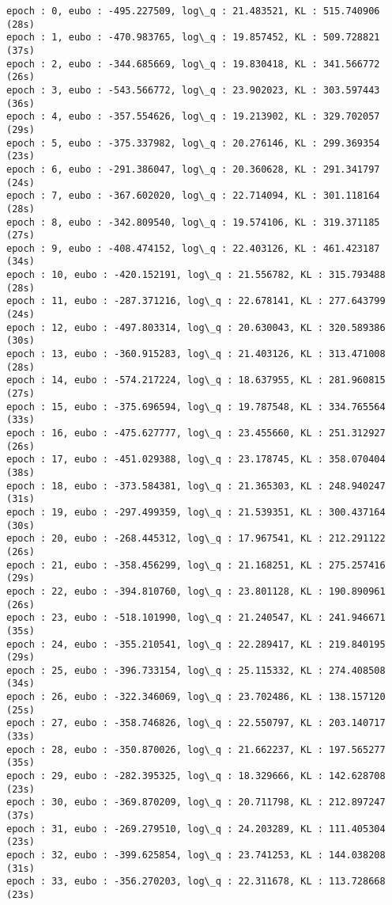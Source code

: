 \documentclass[11pt]{article}
\begin{document}
    \begin{Verbatim}[commandchars=\\\{\}]
epoch : 0, eubo : -495.227509, log\_q : 21.483521, KL : 515.740906 (28s)
epoch : 1, eubo : -470.983765, log\_q : 19.857452, KL : 509.728821 (37s)
epoch : 2, eubo : -344.685669, log\_q : 19.830418, KL : 341.566772 (26s)
epoch : 3, eubo : -543.566772, log\_q : 23.902023, KL : 303.597443 (36s)
epoch : 4, eubo : -357.554626, log\_q : 19.213902, KL : 329.702057 (29s)
epoch : 5, eubo : -375.337982, log\_q : 20.276146, KL : 299.369354 (23s)
epoch : 6, eubo : -291.386047, log\_q : 20.360628, KL : 291.341797 (24s)
epoch : 7, eubo : -367.602020, log\_q : 22.714094, KL : 301.118164 (28s)
epoch : 8, eubo : -342.809540, log\_q : 19.574106, KL : 319.371185 (27s)
epoch : 9, eubo : -408.474152, log\_q : 22.403126, KL : 461.423187 (34s)
epoch : 10, eubo : -420.152191, log\_q : 21.556782, KL : 315.793488 (28s)
epoch : 11, eubo : -287.371216, log\_q : 22.678141, KL : 277.643799 (24s)
epoch : 12, eubo : -497.803314, log\_q : 20.630043, KL : 320.589386 (30s)
epoch : 13, eubo : -360.915283, log\_q : 21.403126, KL : 313.471008 (28s)
epoch : 14, eubo : -574.217224, log\_q : 18.637955, KL : 281.960815 (27s)
epoch : 15, eubo : -375.696594, log\_q : 19.787548, KL : 334.765564 (33s)
epoch : 16, eubo : -475.627777, log\_q : 23.455660, KL : 251.312927 (26s)
epoch : 17, eubo : -451.029388, log\_q : 23.178745, KL : 358.070404 (38s)
epoch : 18, eubo : -373.584381, log\_q : 21.365303, KL : 248.940247 (31s)
epoch : 19, eubo : -297.499359, log\_q : 21.539351, KL : 300.437164 (30s)
epoch : 20, eubo : -268.445312, log\_q : 17.967541, KL : 212.291122 (26s)
epoch : 21, eubo : -358.456299, log\_q : 21.168251, KL : 275.257416 (29s)
epoch : 22, eubo : -394.810760, log\_q : 23.801128, KL : 190.890961 (26s)
epoch : 23, eubo : -518.101990, log\_q : 21.240547, KL : 241.946671 (35s)
epoch : 24, eubo : -355.210541, log\_q : 22.289417, KL : 219.840195 (29s)
epoch : 25, eubo : -396.733154, log\_q : 25.115332, KL : 274.408508 (34s)
epoch : 26, eubo : -322.346069, log\_q : 23.702486, KL : 138.157120 (25s)
epoch : 27, eubo : -358.746826, log\_q : 22.550797, KL : 203.140717 (33s)
epoch : 28, eubo : -350.870026, log\_q : 21.662237, KL : 197.565277 (35s)
epoch : 29, eubo : -282.395325, log\_q : 18.329666, KL : 142.628708 (23s)
epoch : 30, eubo : -369.870209, log\_q : 20.711798, KL : 212.897247 (37s)
epoch : 31, eubo : -269.279510, log\_q : 24.203289, KL : 111.405304 (23s)
epoch : 32, eubo : -399.625854, log\_q : 23.741253, KL : 144.038208 (31s)
epoch : 33, eubo : -356.270203, log\_q : 22.311678, KL : 113.728668 (23s)

\end{Verbatim}
\end{document}
